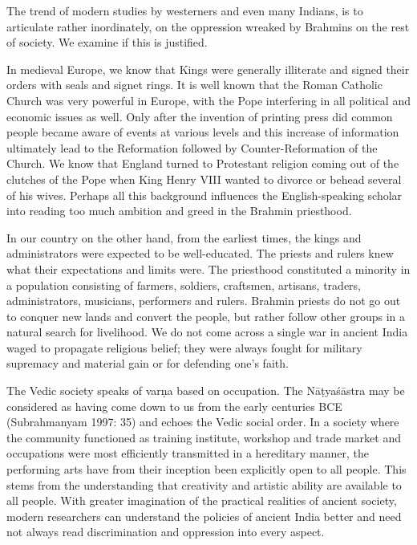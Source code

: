 The trend of modern studies by westerners and even many Indians, is to articulate rather inordinately, on the oppression wreaked by Brahmins on the rest of society. We examine if this is justified.

\vskip 2pt

In medieval Europe, we know that Kings were generally illiterate and signed their orders with seals and signet rings. It is well known that the Roman Catholic Church was very powerful in Europe, with the Pope interfering in all political and economic issues as well. Only after the invention of printing press did common people became aware of events at various levels and this increase of information ultimately lead to the Reformation followed by Counter-Reformation of the Church. We know that England turned to Protestant religion coming out of the clutches of the Pope when King Henry VIII wanted to divorce or behead several of his wives. Perhaps all this background influences the English-speaking scholar into reading too much ambition and greed in the Brahmin priesthood.

\vskip 2pt

In our country on the other hand, from the earliest times, the kings and administrators were expected to be well-educated. The priests and rulers knew what their expectations and limits were. The priesthood constituted a minority in a population consisting of farmers, soldiers, craftsmen, artisans, traders, administrators, musicians, performers and rulers. Brahmin priests do not go out to conquer new lands and convert the people, but rather follow other groups in a natural search for livelihood. We do not come across a single war in ancient India waged to propagate religious belief; they were always fought for military supremacy and material gain or for defending one’s faith.

The Vedic society speaks of varṇa based on occupation. The Nāṭyaśāstra may be considered as having come down to us from the early centuries BCE (Subrahmanyam 1997: 35) and echoes the Vedic social order. In a society where the community functioned as training institute, workshop and trade market and occupations were most efficiently transmitted in a hereditary manner, the performing arts have from their inception been explicitly open to all people. This stems from the understanding that creativity and artistic ability are available to all people. With greater imagination of the practical realities of ancient society, modern researchers can understand the policies of ancient India better and need not always read discrimination and oppression into every aspect.

